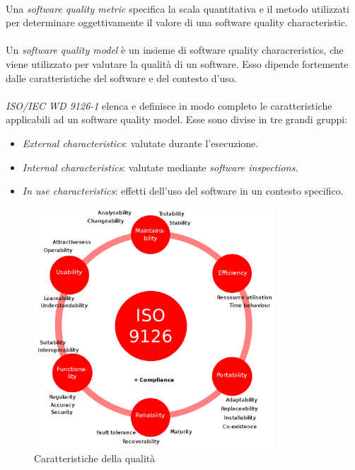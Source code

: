 \documentclass[11pt,a4paper,english]{article}
\begin{document}
\paragraph{} Una \emph{software quality metric} specifica la scala quantitativa e il metodo utilizzati per determinare oggettivamente il valore di una software quality characteristic. 

\paragraph{} Un \emph{software quality model} è un insieme di software quality characreristics, che viene utilizzato per valutare la qualità di un software. Esso dipende fortemente dalle caratteristiche del software e del contesto d'uso. 

\paragraph{} \emph{ISO/IEC WD 9126-1} elenca e definisce in modo completo le caratteristiche applicabili ad un software quality model. Esse sono divise in tre grandi gruppi: \begin{itemize}
    \item \emph{External characteristics}: valutate durante l'esecuzione.
    \item \emph{Internal characteristics}: valutate mediante \emph{software inspections}.
    \item \emph{In use characteristics}: effetti dell'uso del software in un contesto specifico.
\end{itemize}

\begin{figure}[H]
    \centering
    \includegraphics[width=0.8\textwidth]{img/iso_9126.png}
    \caption{Caratteristiche della qualità}
\end{figure}
\end{document}

